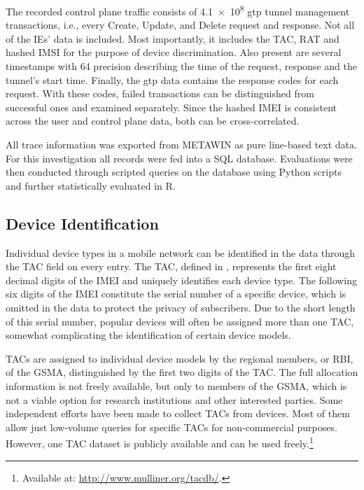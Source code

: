 The recorded control plane traffic consists of \num{4.1e8} \gls{gtp} tunnel management transactions, i.e., every Create, Update, and Delete request and response. Not all of the \glspl{IE}' data is included. Most importantly, it includes the \gls{TAC}, \gls{RAT} and hashed \gls{IMSI} for the purpose of device discrimination. Also present are several timestamps with \SI{64}{\bit} precision describing the time of the request, response and the tunnel's start time. Finally, the \gls{gtp} data contains the response codes for each request. With these codes, failed transactions can be distinguished from successful ones and examined separately. Since the hashed \gls{IMEI} is consistent across the user and control plane data, both can be cross-correlated.

All trace information was exported from \acrshort{METAWIN} as pure line-based text data. For this investigation all records were fed into a \acrshort{SQL} database. Evaluations were then conducted through scripted queries on the database using Python scripts and further statistically evaluated in R.

\subsection{Device Identification}

Individual device types in a mobile network can be identified in the data through the \gls{TAC} field on every entry. The \gls{TAC}, defined in \cite{3gpp.23.003}, represents the first eight decimal digits of the \gls{IMEI} and uniquely identifies each device type. The following six digits of the \gls{IMEI} constitute the serial number of a specific device, which is omitted in the data to protect the privacy of subscribers. Due to the short length of this serial number, popular devices will often be assigned more than one \gls{TAC}, somewhat complicating the identification of certain device models.

\glspl{TAC} are assigned to individual device models by the regional members, or \gls{RBI}, 
of the \gls{GSMA}, distinguished by the first two digits of the \gls{TAC}. The full allocation information is not freely available, but only to members of the \gls{GSMA}, which is not a viable option for research institutions and other interested parties. Some independent efforts have been made to collect \glspl{TAC} from devices. Most of them allow just low-volume queries for specific \glspl{TAC} for non-commercial purposes. However, one \gls{TAC} dataset is publicly available and can be used freely.\footnote{Available at: \url{http://www.mulliner.org/tacdb/}.}

